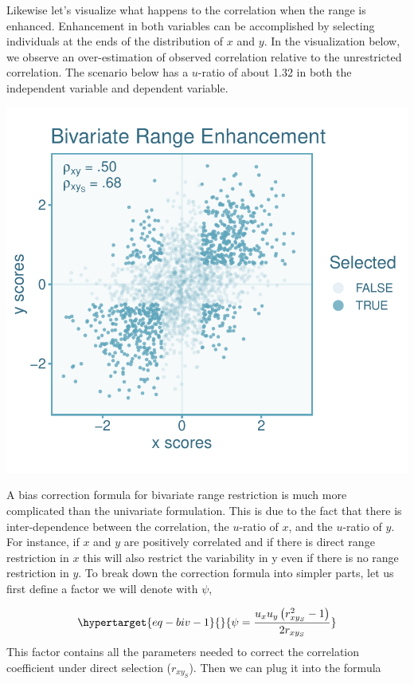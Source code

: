 \documentclass[
  letterpaper,
  DIV=11,
  numbers=noendperiod]{scrreprt}
\begin{document}
Likewise let's visualize what happens to the correlation when the range
is enhanced. Enhancement in both variables can be accomplished by
selecting individuals at the ends of the distribution of \(x\) and
\(y\). In the visualization below, we observe an over-estimation of
observed correlation relative to the unrestricted correlation. The
scenario below has a \(u\)-ratio of about 1.32 in both the independent
variable and dependent variable.

\includegraphics{direct_range_restriction_files/figure-pdf/unnamed-chunk-5-1.pdf}

A bias correction formula for bivariate range restriction is much more
complicated than the univariate formulation. This is due to the fact
that there is inter-dependence between the correlation, the \(u\)-ratio
of \(x\), and the \(u\)-ratio of \(y\). For instance, if \(x\) and \(y\)
are positively correlated and if there is direct range restriction in
\(x\) this will also restrict the variability in y even if there is no
range restriction in \(y\). To break down the correction formula into
simpler parts, let us first define a factor we will denote with
\(\psi\),

\begin{equation}\protect\hypertarget{eq-biv-1}{}{
\psi = \frac{u_x u_y\left(r_{xy_S}^2-1\right)}{2r_{xy_S}}
}\label{eq-biv-1}\end{equation} This factor contains all the parameters
needed to correct the correlation coefficient under direct selection
(\(r_{xy_S}\)). Then we can plug it into the formula
\end{document}

